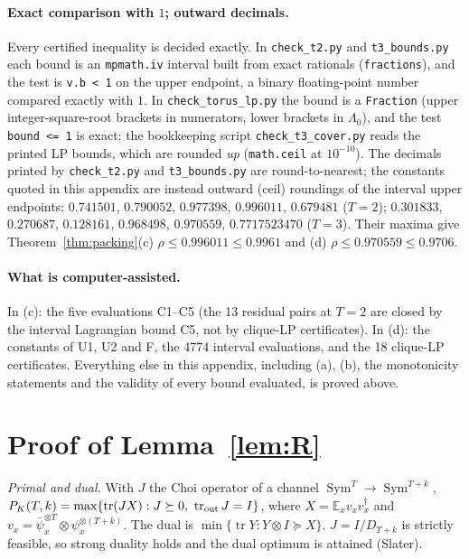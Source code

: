 \documentclass[11pt]{article}
\newcommand{\E}{\mathbb{E}}
\newcommand{\tr}{\operatorname{tr}}
\newcommand{\Sym}{\operatorname{Sym}}
\theoremstyle{definition}
\theoremstyle{remark}
\begin{document}
\paragraph{Exact comparison with $1$; outward decimals.} Every certified inequality is decided exactly. In \nolinkurl{check_t2.py} and
\nolinkurl{t3_bounds.py} each bound is an \texttt{mpmath.iv} interval built from exact rationals (\texttt{fractions}), and the test is
\texttt{v.b < 1} on the upper endpoint, a binary floating-point number compared exactly with $1$. In \nolinkurl{check_torus_lp.py} the bound is a
\texttt{Fraction} (upper integer-square-root brackets in numerators, lower brackets in $\Lambda_0$), and the test \texttt{bound <= 1} is exact; the
bookkeeping script \nolinkurl{check_t3_cover.py} reads the printed LP bounds, which are rounded \emph{up} (\texttt{math.ceil} at $10^{-10}$). The decimals
printed by \nolinkurl{check_t2.py} and \nolinkurl{t3_bounds.py} are round-to-nearest; the constants quoted in this appendix are instead outward
(ceil) roundings of the interval upper endpoints: $0.741501$, $0.790052$, $0.977398$, $0.996011$, $0.679481$ ($T=2$); $0.301833$, $0.270687$, $0.128161$,
$0.968498$, $0.970559$, $0.7717523470$ ($T=3$). Their maxima give Theorem~\ref{thm:packing}(c) $\rho\le0.996011\le0.9961$ and (d) $\rho\le0.970559\le0.9706$.

\paragraph{What is computer-assisted.} In (c): the five evaluations C1--C5 (the 13 residual pairs at $T=2$ are closed by the interval
Lagrangian bound C5, not by clique-LP certificates). In (d): the constants of U1, U2 and F, the 4774 interval evaluations, and the 18 clique-LP
certificates. Everything else in this appendix, including (a), (b), the monotonicity statements and the
validity of every bound evaluated, is proved above.

\section{Proof of Lemma~\ref{lem:R}}\label{app:lemR}
\emph{Primal and dual.} With $J$ the Choi operator of a channel $\Sym^T\to\Sym^{T+k}$, $P_K(T,k)=\max\{\tr(JX):J\succeq0,\ \tr_{\rm out}J=I\}$,
where $X=\E_x v_xv_x^\dagger$ and $v_x=\bar\psi_x^{\otimes T}\otimes\psi_x^{\otimes(T+k)}$. The dual is $\min\{\tr Y:Y\otimes I\succeq X\}$.
$J=I/D_{T+k}$ is strictly feasible, so strong duality holds and the dual optimum is attained (Slater).
\end{document}
